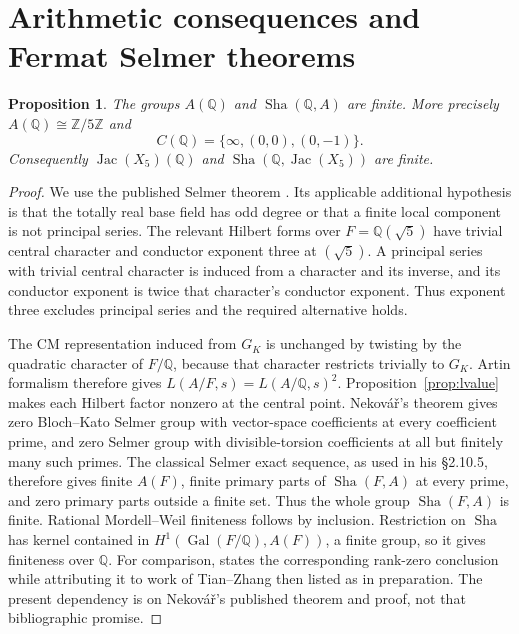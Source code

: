 \documentclass[11pt]{article}
\newcommand{\Q}{\mathbb Q}
\newcommand{\Z}{\mathbb Z}
\newcommand{\Sha}{\operatorname{Sha}}
\newcommand{\Gal}{\operatorname{Gal}}
\newcommand{\Jac}{\operatorname{Jac}}
\newtheorem{proposition}[theorem]{Proposition}
\theoremstyle{definition}
\begin{document}


\section{Arithmetic consequences and Fermat Selmer theorems}

\begin{proposition}\label{prop:arithmetic}
The groups $A(\Q)$ and $\Sha(\Q,A)$ are finite. More precisely
$A(\Q)\cong\Z/5\Z$ and
\[
C(\Q)=\{\infty,(0,0),(0,-1)\}.
\tag{5.1}\label{eq:cpoints}
\]
Consequently $\Jac(X_5)(\Q)$ and $\Sha(\Q,\Jac(X_5))$ are finite.
\end{proposition}

\begin{proof}
We use the published Selmer theorem
\citet[Theorem B, p.~593; proof \S2.10.5, p.~641]{Nekovar2012}.
Its applicable additional hypothesis is
that the totally real base field has odd degree or that a finite local
component is not principal series. The relevant Hilbert forms over
$F=\Q(\sqrt5)$ have trivial central character and conductor exponent
three at $(\sqrt5)$. A principal series with trivial central character
is induced from a character and its inverse, and its conductor
exponent is twice that character's conductor exponent. Thus exponent
three excludes principal series and the required alternative holds.

The CM representation induced from $G_K$ is unchanged by twisting by
the quadratic character of $F/\Q$, because that character restricts
trivially to $G_K$. Artin formalism therefore gives
$L(A/F,s)=L(A/\Q,s)^2$. Proposition~\ref{prop:lvalue} makes each Hilbert
factor nonzero at the central point. Nekov\'a\v r's theorem gives zero
Bloch--Kato Selmer group with vector-space coefficients at every
coefficient prime, and zero Selmer group with divisible-torsion
coefficients at all but finitely many such primes. The classical
Selmer exact sequence, as used in his \S2.10.5, therefore gives finite
$A(F)$, finite primary parts of $\Sha(F,A)$ at every prime, and zero
primary parts outside a finite set. Thus the whole group $\Sha(F,A)$
is finite. Rational Mordell--Weil finiteness follows
by inclusion. Restriction on $\Sha$ has kernel contained in
$H^1(\Gal(F/\Q),A(F))$, a finite group, so it gives finiteness over $\Q$.
For comparison, \citet[Theorem 4.3.2, p.~588]{Zhang2010} states the
corresponding rank-zero conclusion while attributing it to work of
Tian--Zhang then listed as in preparation. The present dependency is
on Nekov\'a\v r's published theorem and proof, not that bibliographic
promise.


\end{proof}
\end{document}
